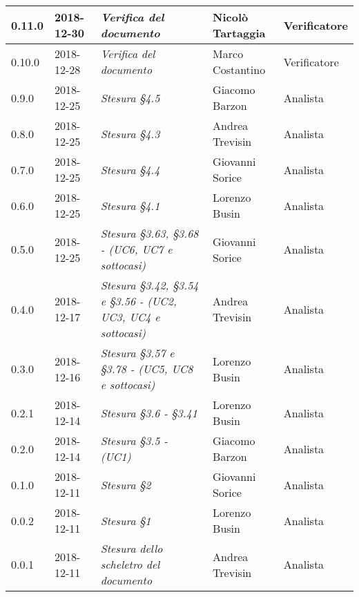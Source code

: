 \begin{longtable}{C{2cm}|C{2.5cm}|C{4.5cm}|C{2.5cm}|C{3cm}}
		0.11.0 & 2018-12-30 & \emph{Verifica del documento} & Nicolò Tartaggia & Verificatore \\
		\hline
		
		0.10.0 & 2018-12-28 & \emph{Verifica del documento} & Marco Costantino & Verificatore \\
		\hline
		
		0.9.0 & 2018-12-25 & \emph{Stesura §4.5} & Giacomo Barzon & Analista \\
		\hline
		
		0.8.0 & 2018-12-25 & \emph{Stesura §4.3} & Andrea Trevisin & Analista \\
		\hline
		
		0.7.0 & 2018-12-25 & \emph{Stesura §4.4} & Giovanni Sorice & Analista \\
		\hline
		
		0.6.0 & 2018-12-25 & \emph{Stesura §4.1} & Lorenzo Busin & Analista \\
		\hline
		
		0.5.0 & 2018-12-25 & \emph{Stesura §3.63, §3.68 - (UC6, UC7 e sottocasi)} & Giovanni Sorice & Analista \\
		\hline
		
		0.4.0 & 2018-12-17 & \emph{Stesura §3.42, §3.54 e §3.56 - (UC2, UC3, UC4 e sottocasi)} & Andrea Trevisin & Analista \\
		\hline
		
		0.3.0 & 2018-12-16 & \emph{Stesura §3.57 e §3.78 - (UC5, UC8 e sottocasi)} & Lorenzo Busin & Analista \\
		\hline
		
		0.2.1 & 2018-12-14 & \emph{Stesura §3.6 - §3.41} & Lorenzo Busin & Analista \\
		\hline
		
		0.2.0 & 2018-12-14 & \emph{Stesura §3.5 - (UC1)} & Giacomo Barzon & Analista \\
		\hline
		
		0.1.0 & 2018-12-11 & \emph{Stesura §2} & Giovanni Sorice & Analista \\
		\hline
		
		0.0.2 & 2018-12-11 & \emph{Stesura §1} & Lorenzo Busin & Analista \\
		\hline
		
		0.0.1 & 2018-12-11 & \emph{Stesura dello scheletro del documento} & Andrea Trevisin & Analista \\
		
	\end{longtable}



\clearpage